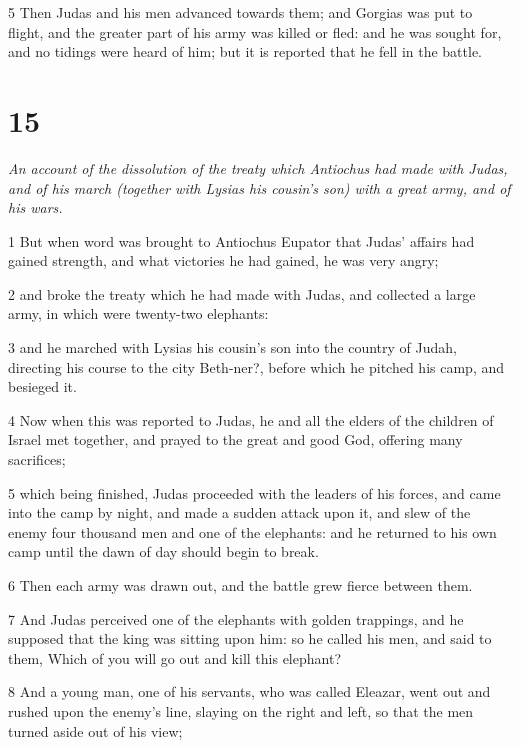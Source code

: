 \par 5 Then Judas and his men advanced towards them; and Gorgias was put to flight, and the greater part of his army was killed or fled: and he was sought for, and no tidings were heard of him; but it is reported that he fell in the battle. 

\chapter{15}

\par \textit{An account of the dissolution of the treaty which Antiochus had made with Judas, and of his march (together with Lysias his cousin's son) with a great army, and of his wars.}

\par 1 But when word was brought to Antiochus Eupator that Judas’ affairs had gained strength, and what victories he had gained, he was very angry; 

\par 2 and broke the treaty which he had made with Judas, and collected a large army, in which were twenty-two elephants: 

\par 3 and he marched with Lysias his cousin’s son into the country of Judah, directing his course to the city Beth-ner?, before which he pitched his camp, and besieged it. 

\par 4 Now when this was reported to Judas, he and all the elders of the children of Israel met together, and prayed to the great and good God, offering many sacrifices; 

\par 5 which being finished, Judas proceeded with the leaders of his forces, and came into the camp by night, and made a sudden attack upon it, and slew of the enemy four thousand men and one of the elephants: and he returned to his own camp until the dawn of day should begin to break. 

\par 6 Then each army was drawn out, and the battle grew fierce between them. 

\par 7 And Judas perceived one of the elephants with golden trappings, and he supposed that the king was sitting upon him: so he called his men, and said to them, Which of you will go out and kill this elephant? 

\par 8 And a young man, one of his servants, who was called Eleazar, went out and rushed upon the enemy’s line, slaying on the right and left, so that the men turned aside out of his view; 

